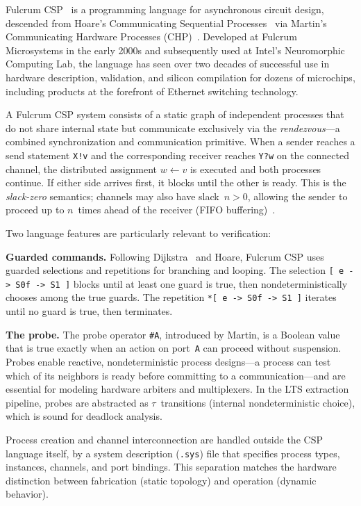 \documentclass[11pt]{article}
\begin{document}
Fulcrum CSP~\cite{FulcrumCSP} is a programming language for
asynchronous circuit design, descended from Hoare's Communicating
Sequential Processes~\cite{Hoare85} via Martin's Communicating
Hardware Processes (CHP)~\cite{Martin90}.  Developed at Fulcrum Microsystems in the
early 2000s and subsequently used at Intel's Neuromorphic Computing
Lab, the language has seen over two decades of successful use in
hardware description, validation, and silicon compilation for dozens
of microchips, including products at the forefront of Ethernet
switching technology.

A Fulcrum CSP system consists of a static graph of independent
processes that do not share internal state but communicate exclusively
via the \emph{rendezvous}---a combined synchronization and
communication primitive.  When a sender reaches a send statement
\texttt{X!v} and the corresponding receiver reaches \texttt{Y?w} on
the connected channel, the distributed assignment $w \leftarrow v$ is
executed and both processes continue.  If either side arrives first, it
blocks until the other is ready.  This is the \emph{slack-zero}
semantics; channels may also have slack~$n > 0$, allowing the sender
to proceed up to $n$~times ahead of the receiver (FIFO
buffering)~\cite{Martin81}.

Two language features are particularly relevant to verification:

\textbf{Guarded commands.}  Following Dijkstra~\cite{Dijkstra75} and
Hoare, Fulcrum CSP uses guarded selections and repetitions for
branching and looping.  The selection
\texttt{[\,e -> S0\;[]\;f -> S1\,]} blocks until at least one guard
is true, then nondeterministically chooses among the true guards.  The
repetition \texttt{*[\,e -> S0\;[]\;f -> S1\,]} iterates until no
guard is true, then terminates.

\textbf{The probe.}  The probe operator \texttt{\#A}, introduced by
Martin, is a Boolean value that is true exactly when an action on
port~\texttt{A} can proceed without suspension.  Probes enable
reactive, nondeterministic process designs---a process can test which
of its neighbors is ready before committing to a communication---and
are essential for modeling hardware arbiters and multiplexers.  In the
LTS extraction pipeline, probes are abstracted as $\tau$~transitions
(internal nondeterministic choice), which is sound for deadlock
analysis.

Process creation and channel interconnection are handled outside the
CSP language itself, by a system description (\texttt{.sys}) file that
specifies process types, instances, channels, and port bindings.
This separation matches the hardware distinction between fabrication
(static topology) and operation (dynamic behavior).
\end{document}
